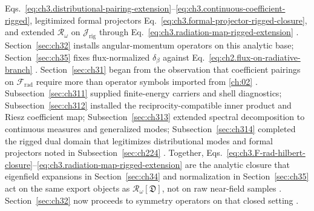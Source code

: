 Eqs.~\eqref{eq:ch3.distributional-pairing-extension}--\eqref{eq:ch3.continuous-coefficient-rigged},
legitimized formal projectors Eq.~\eqref{eq:ch3.formal-projector-rigged-closure}, and extended
\(\mathcal{R}_\omega\) on \(\mathcal{J}_{\mathrm{rig}}\) through
Eq.~\eqref{eq:ch3.radiation-map-rigged-extension} \cite{kato1995}. Section~\ref{sec:ch32}
installs angular-momentum operators on this analytic base; Section~\ref{sec:ch35} fixes flux-normalized
\(\delta_\beta\) against Eq.~\eqref{eq:ch2.flux-on-radiative-branch} \cite{hansen1988}.
Section~\ref{sec:ch31} began from the observation that coefficient pairings on \(\mathcal{F}_{\mathrm{rad}}\)
require more than operator symbols imported from \ref{ch:02} \cite{stratton1941}.
Subsection~\ref{sec:ch311} supplied finite-energy carriers and shell diagnostics;
Subsection~\ref{sec:ch312} installed the reciprocity-compatible inner product and Riesz coefficient map;
Subsection~\ref{sec:ch313} extended spectral decomposition to continuous measures and generalized modes;
Subsection~\ref{sec:ch314} completed the rigged dual domain that legitimizes distributional modes and formal
projectors noted in Subsection~\ref{sec:ch224} \cite{kato1995}. Together,
Eqs.~\eqref{eq:ch3.F-rad-hilbert-closure}--\eqref{eq:ch3.radiation-map-rigged-extension} are the analytic
closure that eigenfield expansions in Section~\ref{sec:ch34} and normalization in Section~\ref{sec:ch35}
act on the same export objects as \(\mathcal{R}_\omega[\mathfrak{D}]\), not on raw near-field samples
\cite{stratton1941}. Section~\ref{sec:ch32} now proceeds to symmetry operators on that closed setting \cite{jackson1999}.
